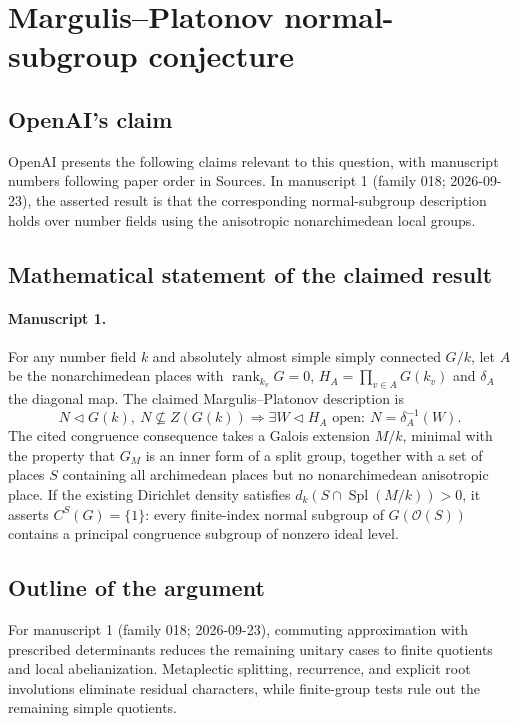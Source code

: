 \documentclass[11pt]{article}
\begin{document}
\section*{Margulis–Platonov normal-subgroup conjecture}

\subsection{OpenAI's claim}
OpenAI presents the following claims relevant to this question, with manuscript numbers following paper order in Sources. In manuscript 1 (family 018; 2026-09-23), the asserted result is that the corresponding normal-subgroup description holds over number fields using the anisotropic nonarchimedean local groups.

\subsection{Mathematical statement of the claimed result}
\paragraph{Manuscript 1.}
For any number field $k$ and absolutely almost simple simply connected $G/k$, let $A$ be the nonarchimedean places with $\operatorname{rank}_{k_v}G=0$, $H_A=\prod_{v\in A}G(k_v)$ and $\delta_A$ the diagonal map. The claimed Margulis--Platonov description is
\[
 N\triangleleft G(k),\ N\not\subseteq Z(G(k))
 \Rightarrow\exists W\triangleleft H_A\text{ open}:\ N=\delta_A^{-1}(W).
\]
The cited congruence consequence takes a Galois extension $M/k$, minimal with the property that $G_M$ is an inner form of a split group, together with a set of places $S$ containing all archimedean places but no nonarchimedean anisotropic place. If the existing Dirichlet density satisfies $d_k(S\cap\operatorname{Spl}(M/k))>0$, it asserts $C^S(G)=\{1\}$: every finite-index normal subgroup of $G(\mathcal O(S))$ contains a principal congruence subgroup of nonzero ideal level.

\subsection{Outline of the argument}
For manuscript 1 (family 018; 2026-09-23), commuting approximation with prescribed determinants reduces the remaining unitary cases to finite quotients and local abelianization. Metaplectic splitting, recurrence, and explicit root involutions eliminate residual characters, while finite-group tests rule out the remaining simple quotients.
\end{document}

